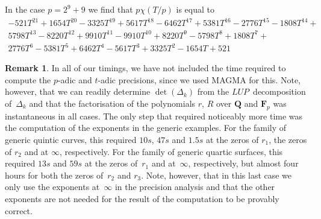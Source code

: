 \documentclass[a4paper,11pt]{article}
\numberwithin{equation}{section}
\newcommand{\QQ}{\mathbf{Q}} %
\newcommand{\FF}{\mathbf{F}} %
\theoremstyle{definition}
\newtheorem{rem}[thm]{Remark}
\begin{document}
In the case $p=2^9+9$ we find that $p \chi(T/p)$ is equal to
\begin{multline*}
-521T^{21} + 1654T^{20} - 3325T^{19} + 5617T^{18} - 6462T^{17} + 5381T^{16} - 2776T^{15} - 1808T^{14} + \\
5798T^{13} - 8220T^{12} + 9910T^{11} - 9910T^{10} +  8220T^{9} - 5798T^{8} + 1808T^{7} + \\
2776T^{6} - 5381T^{5} + 6462T^{4} - 5617T^3 + 3325T^2 - 1654T + 521
\end{multline*}


\begin{rem}
In all of our timings, we have not included the time required to compute 
the $p$-adic and $t$-adic precisions, since we used MAGMA for this. Note, 
however, that we can readily determine $\det(\Delta_k)$ from the 
$LUP$~decomposition of~$\Delta_k$ and that the factorisation of the 
polynomials $r$, $R$ over $\QQ$ and $\FF_p$ was instantaneous in all 
cases. The only step that required noticeably more time was the 
computation of the exponents in the generic examples. For the family of 
generic quintic curves, this required $10s$, $47s$ and $1.5s$ at the 
zeros of $r_1$, the zeros of $r_2$ and at $\infty$, respectively. For the 
family of generic quartic surfaces, this required $13s$ and $59s$ at the 
zeros of~$r_1$ and at~$\infty$, respectively, but almost four hours for 
both the zeros of~$r_2$ and $r_3$.  Note, however, that in this last case 
we only use the exponents at~$\infty$ in the precision analysis and that
the other exponents are not needed for the result of the computation to
be provably correct.
\end{rem}




\end{document}
